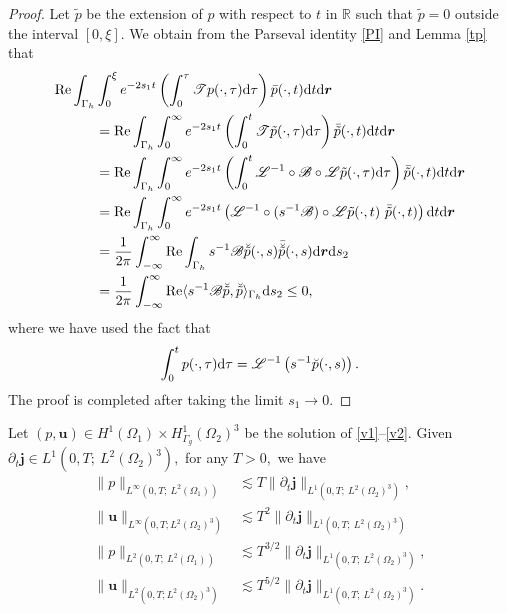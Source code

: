 \documentclass[final,leqno]{siamltex}
\begin{document}
\begin{proof}
Let $\tilde p$ be the extension of $p$ with respect to  $t$ in $\mathbb R$ such
that $\tilde p =0$ outside the interval $[0, \xi].$ We obtain from the
Parseval identity \eqref{PI} and Lemma \ref{tp} that
\begin{align*}
  {\rm Re} \int_{\Gamma_h} &\int_0^{\xi}
  e^{-2 s_1 t} \left( \int_0^{\tau} \mathscr T p (\cdot, \tau) {\rm d} \tau
\right) \bar  p (\cdot, t) {\rm d} t {\rm d} \boldsymbol r\\
&  = {\rm Re} \int_{\Gamma_h} \int_0^{\infty} e^{- 2 s_1 t} \left( \int_0^{t}
\mathscr T  \tilde p (\cdot, \tau) {\rm d} \tau \right) \bar {\tilde p} (\cdot,
t) {\rm d} t {\rm d} \boldsymbol r\\
  &= {\rm Re} \int_{\Gamma_h} \int_0^{\infty} e^{-2 s_1 t} \left( \int_0^t
\mathscr L^{-1} \circ \mathscr{B} \circ \mathscr L
  \tilde p (\cdot, \tau) {\rm d} \tau \right) \bar {\tilde  p} (\cdot, t) {\rm
d} t{\rm d} \boldsymbol r\\
  &={\rm Re} \int_{\Gamma_h} \int_0^{\infty}  e^{- 2 s_1 t} \left( \mathscr
L^{-1} \circ (s^{-1} \mathscr{B})
  \circ \mathscr L  \tilde p (\cdot, t) ~\bar {\tilde p} (\cdot, t)   \right)
{\rm d} t {\rm d} \boldsymbol r\\
  &=\frac{1}{2 \pi} \int_{-\infty}^{\infty} {\rm Re} \int_{\Gamma_h} s^{-1}
\mathscr{B}\breve {\tilde p} (\cdot, s) \bar {\breve {\tilde p}} (\cdot, s) {\rm
d} \boldsymbol r {\rm d} s_2\\
  &=\frac{1}{2\pi} \int_{-\infty}^{\infty} {\rm Re} \langle s^{-1} \mathscr{B}
\breve{\tilde p}, \breve {\tilde p} \rangle_{\Gamma_h} {\rm d} s_2 \leq 0,
\end{align*}
where we have used the fact that
\[
 \int_0^{t} p (\cdot, \tau){\rm d} \tau = \mathscr L^{-1} \left( s^{-1} \breve
{p} (\cdot, s) \right).
\]
The proof is completed after taking the limit $s_1 \to 0$.
\end{proof}

\begin{theorem}
Let $ (p, \boldsymbol u) \in H^1 (\Omega_1) \times H^1_{\Gamma_g} (\Omega_2)^3$
be the solution of \eqref{v1}--\eqref{v2}.  Given $ \partial_t \boldsymbol j
\in L^1 \left( 0, T; ~L^2 (\Omega_2)^3 \right),$  for any $T>0,$ we have
\begin{align}
  \|p\|_{L^{\infty}\left(0, T;~ L^2(\Omega_1) \right)}
 &\lesssim T  \|\partial_t \boldsymbol j\|_{L^1(0, T; ~L^2 (\Omega_2)^3)},
\label{ess1}\\
 \|\boldsymbol u\|_{L^{\infty} (0, T; L^2 (\Omega_2)^3)}
 &\lesssim  T^2  \|\partial_t \boldsymbol j\|_{L^1(0, T; ~L^2 (\Omega_2)^3)}
\label{ess2}\\
 \|p\|_{L^{2}\left(0, T;~ L^2(\Omega_1) \right)}
 &\lesssim T^{3/2}  \|\partial_t \boldsymbol j\|_{L^1(0, T; ~L^2 (\Omega_2)^3)},
\label{ess}\\
\|\boldsymbol u\|_{L^2 (0, T; L^2 (\Omega_2)^3)}&\lesssim   
T^{5/2}\|\partial_t \boldsymbol j\|_{L^1(0, T; ~L^2(\Omega_2)^3)}. \label{ess3}
\end{align}
\end{theorem}
\end{document}
